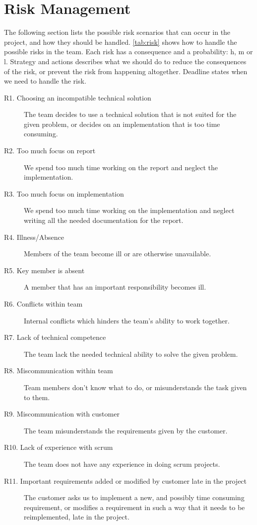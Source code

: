 \section{Risk Management}
\label{sec:plan:risk}
The following section lists the possible risk scenarios that can occur in the project, and how they should be handled. \autoref{tab:risk} shows how to handle the possible risks in the team. Each risk has a consequence and a probability:  \Gls{h}, \Gls{m} or \Gls{l}.
Strategy and actions describes what we should do to reduce the consequences of the risk, or prevent the risk from happening altogether. Deadline states when we need to handle the risk.
\begin{description}
\item[R1. Choosing an incompatible technical solution]  The team decides to use a technical solution that is not suited for the given problem, or decides on an implementation that is too time consuming.
\item[R2. Too much focus on report]  We spend too much time working on the report and neglect the implementation. 
\item[R3. Too much focus on implementation]  We spend too much time working on the implementation and neglect writing all the needed documentation for the report.
\item[R4. Illness/Absence]  Members of the team become ill or are otherwise unavailable. 
\item[R5. Key member is absent] A member that has an important responsibility becomes ill.
\item[R6. Conflicts within team]  Internal conflicts which hinders the team's ability to work together. 
\item[R7. Lack of technical competence]  The team lack the needed technical ability to solve the given problem. 
\item[R8. Miscommunication within team]  Team members don’t know what to do, or misunderstands the task given to them. 
\item[R9. Miscommunication with customer]  The team misunderstands the requirements given by the customer. 
\item[R10. Lack of experience with \Gls{scrum}]  The team does not have any experience in doing \Gls{scrum} projects.
\item[R11. Important requirements added or modified by customer late in the project] The customer asks us to implement a new, and possibly time consuming requirement, or modifies a requirement in such a way that it needs to be reimplemented, late in the project.
\end{description}

